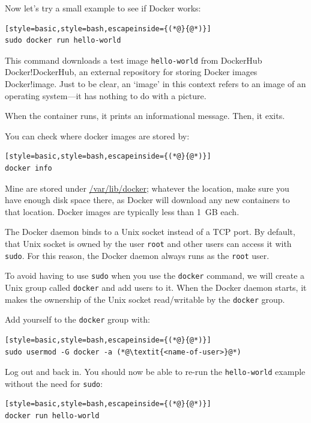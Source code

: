 \documentclass[12pt, a4paper, twoside, openany, titlepage]{book}
\begin{document}
Now let's try a small example to see if Docker works:
\begin{lstlisting}[style=basic,style=bash,escapeinside={(*@}{@*)}]
sudo docker run hello-world
\end{lstlisting}

This command downloads a test image \texttt{hello-world} from DockerHub\index
{Docker!DockerHub}, an external repository for storing Docker images\index
{Docker!image}. Just to be clear, an `image' in this context refers to an
image of an operating system---it has nothing to do with a picture.

When the container runs, it prints an informational message. Then, it exits.

You can check where docker images are stored by:
\begin{lstlisting}[style=basic,style=bash,escapeinside={(*@}{@*)}]
docker info
\end{lstlisting}
Mine are stored under \url{/var/lib/docker}; whatever the location, make
sure you have enough disk space there, as Docker will download any new
containers to that location. Docker images are typically less than 1~GB each.

The Docker daemon binds to a Unix socket instead of a TCP port. By default,
that Unix socket is owned by the user \texttt{root} and other users can
access it with \texttt{sudo}. For this reason, the Docker daemon always runs
as the \texttt{root} user.

To avoid having to use \texttt{sudo} when you use the \texttt{docker}
command, we will create a Unix group called \texttt{docker} and add users to
it. When the Docker daemon starts, it makes the ownership of the Unix socket
read/writable by the \texttt{docker} group.

Add yourself to the \texttt{docker} group with:
\begin{lstlisting}[style=basic,style=bash,escapeinside={(*@}{@*)}]
sudo usermod -G docker -a (*@\textit{<name-of-user>}@*)
\end{lstlisting}
Log out and back in. You should now be able to re-run the \texttt
{hello-world} example without the need for \texttt{sudo}:
\begin{lstlisting}[style=basic,style=bash,escapeinside={(*@}{@*)}]
docker run hello-world
\end{lstlisting}
\end{document}
